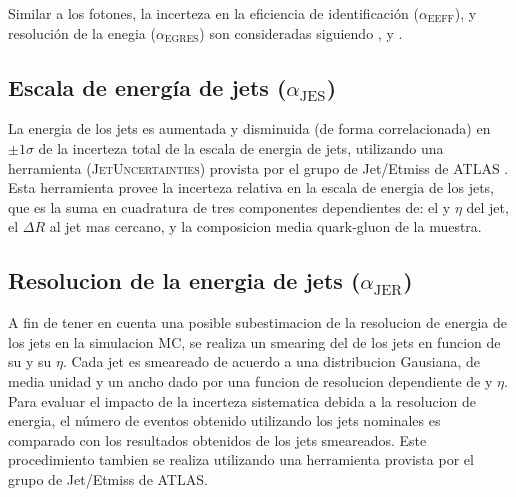 Similar a los fotones, la incerteza en la eficiencia de identificación ($\alpha_\text{EEFF}$), y resolución de
la enegia ($\alpha_\text{EGRES}$) son consideradas siguiendo \cite{EleEffTwiki}, \cite{EGScaleTwiki}
y \cite{MCPTwiki}.





\subsection{Escala de energía de jets ($\alpha_\mathrm{JES}$)}

La energia de los jets es aumentada y disminuida (de forma correlacionada) en
$\pm1\sigma$ de la incerteza total de la escala de energia de jets, utilizando
una herramienta (\textsc{JetUncertainties}) provista por el grupo de Jet/Etmiss de ATLAS \cite{JesTwiki}.
Esta herramienta provee la incerteza relativa en la escala de energia de los jets,
que es la suma en cuadratura de tres componentes dependientes de: el {\pt} y $\eta$
del jet, el $\Delta R$ al jet mas cercano, y la composicion media quark-gluon de la muestra.



\subsection{Resolucion de la energia de jets ($\alpha_\mathrm{JER}$)}

A fin de tener en cuenta una posible subestimacion de la resolucion de energia de los jets
en la simulacion MC, se realiza un smearing del {\pt} de los jets en funcion de su \pt y su $\eta$.
Cada jet es smeareado de acuerdo a una distribucion Gausiana, de media unidad y un ancho
dado por una funcion de resolucion dependiente de {\pt} y $\eta$. Para evaluar el impacto
de la incerteza sistematica debida a la resolucion de energia, el número de eventos obtenido utilizando
los jets nominales es comparado con los resultados obtenidos de los jets smeareados.
Este procedimiento tambien se realiza utilizando una herramienta provista por el grupo de Jet/Etmiss
de ATLAS.


